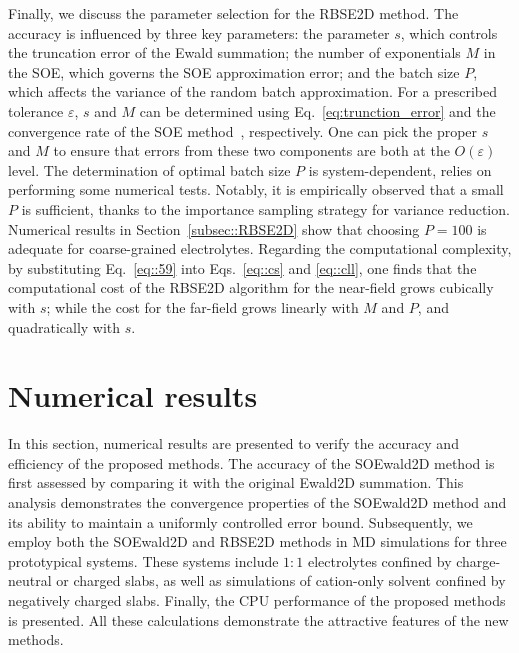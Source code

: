 Finally, we discuss the parameter selection for the RBSE2D method. The accuracy is influenced by three key parameters: the parameter $s$, which controls the truncation error of the Ewald summation; the number of exponentials $M$ in the SOE, which governs the SOE approximation error; and the batch size $P$, which affects the variance of the random batch approximation. For a prescribed tolerance $\varepsilon$, $s$ and $M$ can be determined using Eq.~\eqref{eq:trunction_error} and the convergence rate of the SOE method~\cite{gao2021kernelindependent}, respectively. One can pick the proper $s$ and $M$ to ensure that errors from these two components are both at the $O(\varepsilon)$ level. 
The determination of optimal batch size $P$ is system-dependent, relies on performing some numerical tests. Notably, it is empirically observed that a small $P$ is sufficient, thanks to the importance sampling strategy for variance reduction. Numerical results in Section~\ref{subsec::RBSE2D} show that choosing $P=100$ is adequate for coarse-grained electrolytes. 
Regarding the computational complexity, by substituting Eq.~\eqref{eq::59} into Eqs.~\eqref{eq::cs} and \eqref{eq::cll}, one finds that the computational cost of the RBSE2D algorithm for the near-field grows cubically with $s$; while the cost for the far-field grows linearly with $M$ and $P$, and quadratically with $s$.


\section{Numerical results} \label{sec:md}
In this section, numerical results are presented to verify the accuracy and efficiency of the proposed methods. 
The accuracy of the SOEwald2D method is first assessed by comparing it with the original Ewald2D summation. 
This analysis demonstrates the convergence properties of the SOEwald2D method and its ability to maintain a uniformly controlled error bound. 
Subsequently, we employ both the SOEwald2D and RBSE2D methods in MD simulations for three prototypical systems.
These systems include $1:1$ electrolytes confined by charge-neutral or charged slabs, as well as simulations of cation-only solvent confined by negatively charged slabs. 
Finally, the CPU performance of the proposed methods is presented. 
All these calculations demonstrate the attractive features of the new methods.

